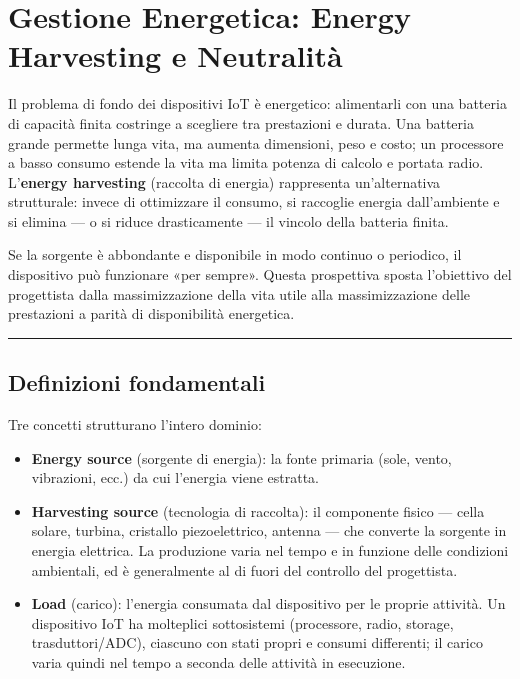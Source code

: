 \documentclass[
  italian,
  openany]{book}
\providecommand{\tightlist}{%
  \setlength{\itemsep}{0pt}\setlength{\parskip}{0pt}}
\begin{document}
\newpage

\chapter{Gestione Energetica: Energy Harvesting e
Neutralità}\label{gestione-energetica-energy-harvesting-e-neutralituxe0}

Il problema di fondo dei dispositivi IoT è energetico: alimentarli con
una batteria di capacità finita costringe a scegliere tra prestazioni e
durata. Una batteria grande permette lunga vita, ma aumenta dimensioni,
peso e costo; un processore a basso consumo estende la vita ma limita
potenza di calcolo e portata radio. L'\textbf{energy harvesting}
(raccolta di energia) rappresenta un'alternativa strutturale: invece di
ottimizzare il consumo, si raccoglie energia dall'ambiente e si elimina
--- o si riduce drasticamente --- il vincolo della batteria finita.

Se la sorgente è abbondante e disponibile in modo continuo o periodico,
il dispositivo può funzionare «per sempre». Questa prospettiva sposta
l'obiettivo del progettista dalla massimizzazione della vita utile alla
massimizzazione delle prestazioni a parità di disponibilità energetica.

\begin{center}\rule{0.5\linewidth}{0.5pt}\end{center}

\section{Definizioni fondamentali}\label{definizioni-fondamentali}

Tre concetti strutturano l'intero dominio:

\begin{itemize}
\tightlist
\item
  \textbf{Energy source} (sorgente di energia): la fonte primaria (sole,
  vento, vibrazioni, ecc.) da cui l'energia viene estratta.
\item
  \textbf{Harvesting source} (tecnologia di raccolta): il componente
  fisico --- cella solare, turbina, cristallo piezoelettrico, antenna
  --- che converte la sorgente in energia elettrica. La produzione varia
  nel tempo e in funzione delle condizioni ambientali, ed è generalmente
  al di fuori del controllo del progettista.
\item
  \textbf{Load} (carico): l'energia consumata dal dispositivo per le
  proprie attività. Un dispositivo IoT ha molteplici sottosistemi
  (processore, radio, storage, trasduttori/ADC), ciascuno con stati
  propri e consumi differenti; il carico varia quindi nel tempo a
  seconda delle attività in esecuzione.
\end{itemize}
\end{document}
